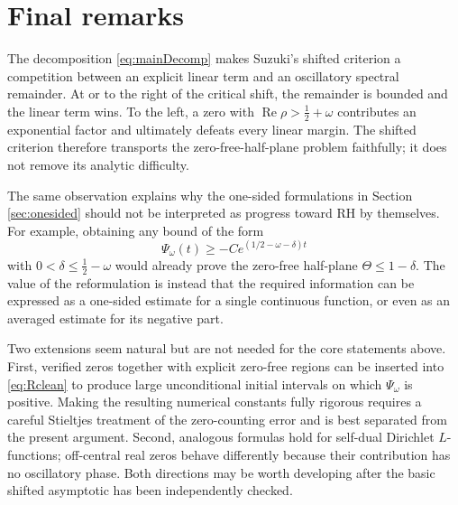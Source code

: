 \documentclass[11pt,reqno]{amsart}
\theoremstyle{plain}
\theoremstyle{definition}
\newcommand{\Rp}{\operatorname{Re}}
\begin{document}
\section{Final remarks}

The decomposition \eqref{eq:mainDecomp} makes Suzuki's shifted criterion a competition between an
explicit linear term and an oscillatory spectral remainder.  At or to the right of the critical
shift, the remainder is bounded and the linear term wins.  To the left, a zero with
$\Rp\rho>\tfrac12+\omega$ contributes an exponential factor and ultimately defeats every linear
margin.  The shifted criterion therefore transports the zero-free-half-plane problem faithfully;
it does not remove its analytic difficulty.

The same observation explains why the one-sided formulations in Section \ref{sec:onesided} should
not be interpreted as progress toward RH by themselves.  For example, obtaining any bound of the
form
\[
 \Psi_\omega(t)\ge-Ce^{(1/2-\omega-\delta)t}
\]
with $0<\delta\le\tfrac12-\omega$ would already prove the zero-free half-plane $\Theta\le1-\delta$.  The value of the
reformulation is instead that the required information can be expressed as a one-sided estimate for
a single continuous function, or even as an averaged estimate for its negative part.

Two extensions seem natural but are not needed for the core statements above.  First, verified
zeros together with explicit zero-free regions can be inserted into \eqref{eq:Rclean} to produce
large unconditional initial intervals on which $\Psi_\omega$ is positive.  Making the resulting
numerical constants fully rigorous requires a careful Stieltjes treatment of the zero-counting
error and is best separated from the present argument.  Second, analogous formulas hold for
self-dual Dirichlet $L$-functions; off-central real zeros behave differently because their
contribution has no oscillatory phase.  Both directions may be worth developing after the basic
shifted asymptotic has been independently checked.
\end{document}
